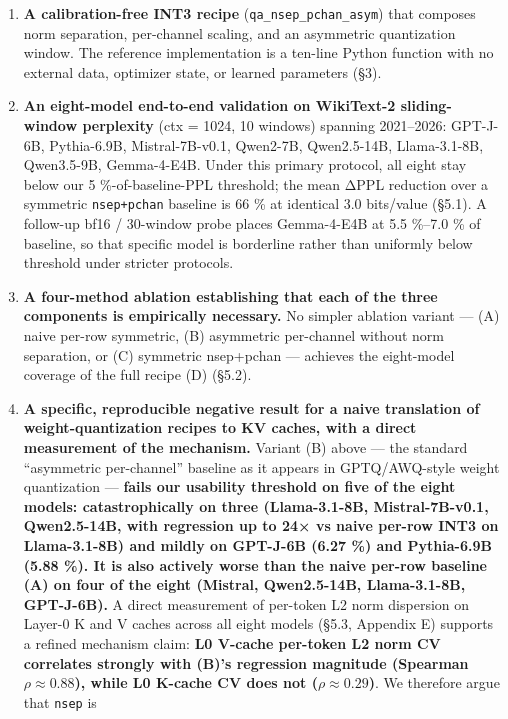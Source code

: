 \documentclass[
]{article}
\begin{document}
\begin{enumerate}
\def\labelenumi{\arabic{enumi}.}
\item
  \textbf{A calibration-free INT3 recipe}
  (\texttt{qa\_nsep\_pchan\_asym}) that composes norm separation,
  per-channel scaling, and an asymmetric quantization window. The
  reference implementation is a ten-line Python function with no
  external data, optimizer state, or learned parameters (§3).
\item
  \textbf{An eight-model end-to-end validation on WikiText-2
  sliding-window perplexity} (ctx = 1024, 10 windows) spanning
  2021--2026: GPT-J-6B, Pythia-6.9B, Mistral-7B-v0.1, Qwen2-7B,
  Qwen2.5-14B, Llama-3.1-8B, Qwen3.5-9B, Gemma-4-E4B. Under this primary
  protocol, all eight stay below our 5 \%-of-baseline-PPL threshold; the
  mean ΔPPL reduction over a symmetric \texttt{nsep+pchan} baseline is
  66 \% at identical 3.0 bits/value (§5.1). A follow-up bf16 / 30-window
  probe places Gemma-4-E4B at 5.5 \%--7.0 \% of baseline, so that
  specific model is borderline rather than uniformly below threshold
  under stricter protocols.
\item
  \textbf{A four-method ablation establishing that each of the three
  components is empirically necessary.} No simpler ablation variant ---
  (A) naive per-row symmetric, (B) asymmetric per-channel without norm
  separation, or (C) symmetric nsep+pchan --- achieves the eight-model
  coverage of the full recipe (D) (§5.2).
\item
  \textbf{A specific, reproducible negative result for a naive
  translation of weight-quantization recipes to KV caches, with a direct
  measurement of the mechanism.} Variant (B) above --- the standard
  ``asymmetric per-channel'' baseline as it appears in GPTQ/AWQ-style
  weight quantization --- \textbf{fails our usability threshold on five
  of the eight models: catastrophically on three (Llama-3.1-8B,
  Mistral-7B-v0.1, Qwen2.5-14B, with regression up to 24× vs naive
  per-row INT3 on Llama-3.1-8B) and mildly on GPT-J-6B (6.27 \%) and
  Pythia-6.9B (5.88 \%). It is also actively worse than the naive
  per-row baseline (A) on four of the eight (Mistral, Qwen2.5-14B,
  Llama-3.1-8B, GPT-J-6B).} A direct measurement of per-token L2 norm
  dispersion on Layer-0 K and V caches across all eight models (§5.3,
  Appendix E) supports a refined mechanism claim: \textbf{L0 V-cache
  per-token L2 norm CV correlates strongly with (B)'s regression
  magnitude (Spearman \(\rho \approx 0.88\)), while L0 K-cache CV does
  not (\(\rho \approx 0.29\))}. We therefore argue that \texttt{nsep} is

\end{enumerate}
\end{document}
